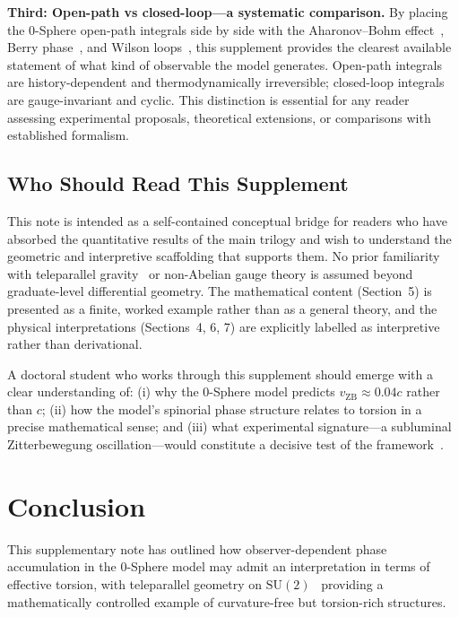 \documentclass[12pt,letterpaper]{article}
\begin{document}
\textbf{Third: Open-path vs closed-loop---a systematic comparison.} By placing the 0-Sphere open-path integrals side by side with the Aharonov--Bohm effect~\cite{ABEffect}, Berry phase~\cite{Berry1984}, and Wilson loops~\cite{WilsonLoop}, this supplement provides the clearest available statement of what kind of observable the model generates. Open-path integrals are history-dependent and thermodynamically irreversible; closed-loop integrals are gauge-invariant and cyclic. This distinction is essential for any reader assessing experimental proposals, theoretical extensions, or comparisons with established formalism.

\subsection{Who Should Read This Supplement}

This note is intended as a self-contained conceptual bridge for readers who have absorbed the quantitative results of the main trilogy and wish to understand the geometric and interpretive scaffolding that supports them. No prior familiarity with teleparallel gravity~\cite{Aldrovandi2013} or non-Abelian gauge theory is assumed beyond graduate-level differential geometry. The mathematical content (Section~5) is presented as a finite, worked example rather than as a general theory, and the physical interpretations (Sections~4, 6, 7) are explicitly labelled as interpretive rather than derivational.

A doctoral student who works through this supplement should emerge with a clear understanding of: (i) why the 0-Sphere model predicts $v_{\mathrm{ZB}} \approx 0.04c$ rather than $c$; (ii) how the model's spinorial phase structure relates to torsion in a precise mathematical sense; and (iii) what experimental signature---a subluminal Zitterbewegung oscillation---would constitute a decisive test of the framework~\cite{hanamura18356895}.


\section{Conclusion}

\justifying
This supplementary note has outlined how observer-dependent phase accumulation in the 0-Sphere model may admit an interpretation in terms of effective torsion, with teleparallel geometry on $\mathrm{SU}(2)$~\cite{Weitzenbock1923,Aldrovandi2013} providing a mathematically controlled example of curvature-free but torsion-rich structures.
\end{document}
